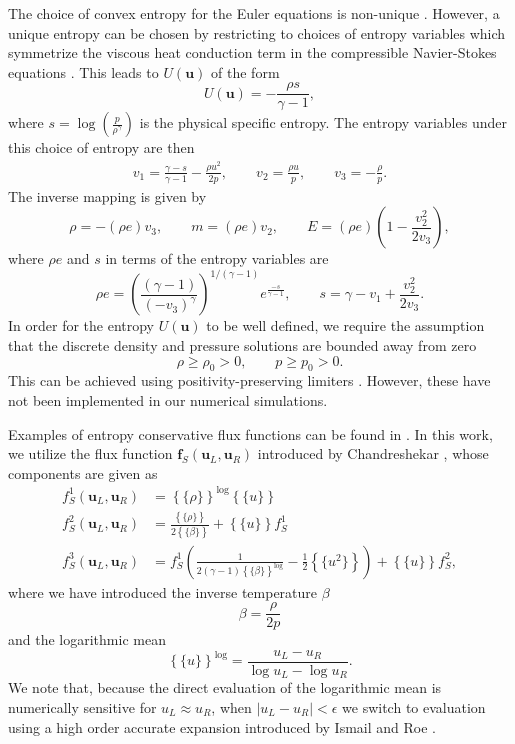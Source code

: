 \documentclass[preprint,10pt]{elsarticle}
\theoremstyle{definition}
\theoremstyle{lemma}
\theoremstyle{theorem}
\theoremstyle{assumption}
\newcommand{\LRp}[1]{\left( #1 \right)}
\newcommand{\LRb}[1]{\left| #1 \right|}
\newcommand{\LRc}[1]{\left\{ #1 \right\}}
\newcommand{\avg}[1] {\ensuremath{\LRc{\!\{#1\}\!}}}
\begin{document}
The choice of convex entropy for the Euler equations is non-unique \cite{harten1983symmetric}.  However, a unique entropy can be chosen by restricting to choices of entropy variables which symmetrize the viscous heat conduction term in the compressible Navier-Stokes equations \cite{hughes1986new}.  This leads to $U(\bm{u})$ of the form
\[
U(\bm{u}) = -\frac{\rho s}{\gamma-1},
\]
where $s = \log\LRp{\frac{p}{\rho^\gamma}}$ is the physical specific entropy.  The entropy variables under this choice of entropy are then
\begin{align*}
v_1 = \frac{\gamma-s}{\gamma-1} - \frac{\rho u^2}{2p}, \qquad v_2 = \frac{\rho u}{p}, \qquad v_3 = -\frac{\rho}{p}.
\end{align*}
The inverse mapping is given by 
\[
\rho = -(\rho e) v_3, \qquad m = (\rho e) v_2, \qquad E = (\rho e)\LRp{1 - \frac{v_2^2}{2 v_3}},
\]
where $\rho e$ and $s$ in terms of the entropy variables are 
\[
\rho e = \LRp{\frac{(\gamma-1)}{\LRp{-v_3}^{\gamma}}}^{1/(\gamma-1)}e^{\frac{-s}{\gamma-1}}, \qquad s = \gamma - v_1 + \frac{v_2^2}{2v_3}.
\]
In order for the entropy $U(\bm{u})$ to be well defined, we require the assumption that the discrete density and pressure solutions are bounded away from zero
\begin{equation}
\rho \geq \rho_0 > 0,  \qquad p \geq p_0 > 0.  \label{eq:assumption2}
\end{equation}
This can be achieved using positivity-preserving limiters \cite{zhang2010positivity, zhang2012maximum}.  However, these have not been implemented in our numerical simulations.  

Examples of entropy conservative flux functions can be found in \cite{ismail2009affordable, chandrashekar2013kinetic}.  In this work, we utilize the flux function $\bm{f}_S(\bm{u}_L,\bm{u}_R)$ introduced by Chandreshekar \cite{chandrashekar2013kinetic}, whose components are given as
\begin{align*}
f^1_S(\bm{u}_L,\bm{u}_R) &= \avg{\rho}^{\log} \avg{u}\\
f^2_S(\bm{u}_L,\bm{u}_R) &= \frac{\avg{\rho}}{2\avg{\beta}} + \avg{u}f^1_S\\
f^3_S(\bm{u}_L,\bm{u}_R) &= f^1_S\LRp{\frac{1}{2(\gamma-1)\avg{\beta}^{\log}} - \frac{1}{2}\avg{u^2}} + \avg{u}f^2_S,
\end{align*}
where we have introduced the inverse temperature $\beta$
\[
\beta = \frac{\rho}{2p}
\]
and the logarithmic mean
\[
\avg{u}^{\log} = \frac{u_L - u_R}{\log{u_L}- \log{u_R}}.  
\]
We note that, because the direct evaluation of the logarithmic mean is numerically sensitive for $u_L\approx u_R$, when $\LRb{u_L-u_R}<\epsilon$ we switch to evaluation using a high order accurate expansion introduced by Ismail and Roe \cite{ismail2009affordable}.  
\end{document}
